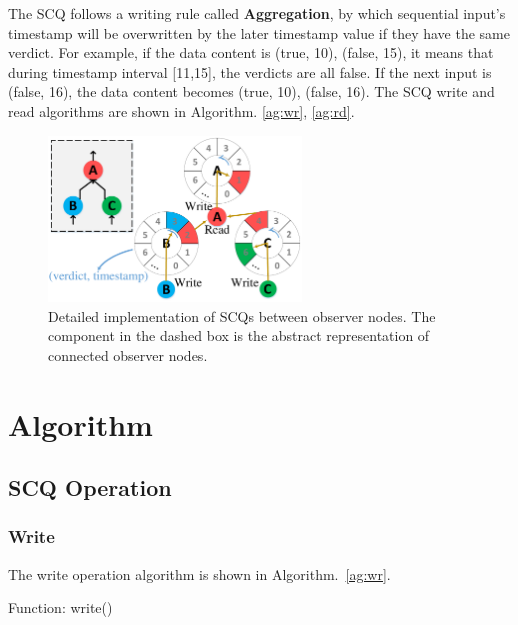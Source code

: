 The SCQ follows a writing rule called \textbf{Aggregation}, by which sequential input's timestamp will be overwritten by the later timestamp value if they have the same verdict. For example, if the data content is (true, 10), (false, 15), it means that during timestamp interval [11,15], the verdicts are all false. If the next input is (false, 16), the data content becomes (true, 10), (false, 16). The SCQ write and read algorithms are shown in Algorithm. \ref{ag:wr}, \ref{ag:rd}.\par
\begin{figure}
\centering
\includegraphics[width=0.6\textwidth]{fig/scq_cb.pdf}
\caption{\label{fig:scq}Detailed implementation of SCQs between observer nodes. The component in the dashed box is the abstract representation of connected observer nodes.}
\end{figure}





\section{Algorithm}
\subsection{SCQ Operation}

\subsubsection{Write}
The write operation algorithm is shown in Algorithm.~\ref{ag:wr}.

\begin{algorithm}
\SetAlgoLined
{}
 \caption{\label{ag:wr}Function: write()}
\end{algorithm}

